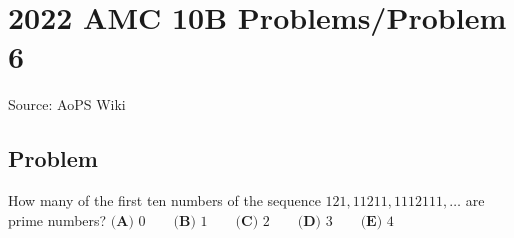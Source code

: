 \documentclass[12pt]{article}
\begin{document}
\section*{{2022 AMC 10B Problems/Problem 6}}
Source: AoPS Wiki

\subsection*{Problem}
How many of the first ten numbers of the sequence $121, 11211, 1112111, \ldots$ are prime numbers? $\textbf{(A) } 0 \qquad \textbf{(B) }1 \qquad \textbf{(C) }2 \qquad \textbf{(D) }3 \qquad \textbf{(E) }4$
\end{document}
